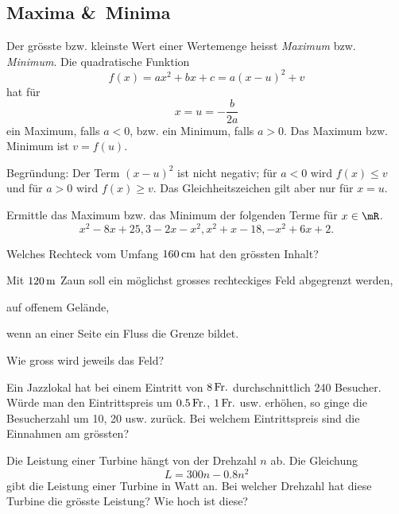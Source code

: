 \documentclass[%
11pt,%
twoside,%
titlepage,%
german,%
headsepline%
]{scrartcl}
\begin{document}
\subsection{Maxima \&\ Minima}
Der gr\"osste bzw. kleinste Wert einer Wertemenge heisst \emph{Maximum} bzw. \emph{Minimum}. Die quadratische Funktion
$$f(x)=ax^2+bx+c=a(x-u)^2+v$$
hat f\"ur
$$x =u=-\frac{b}{2a}$$
ein Maximum, falls $a<0$, bzw. ein Minimum, falls $a>0$. Das Maximum bzw. Minimum ist $v =f(u)$.

Begr\"undung: Der Term $(x - u)^2$ ist nicht negativ; f\"ur $a <0$ wird $f(x)\leq v$ und f\"ur $a > 0$ wird $f(x) \geq v$. Das Gleichheitszeichen gilt aber nur f\"ur $x =u$.

\begin{ueb}[Extremwerte]
Ermittle das Maximum bzw. das Minimum der folgenden Terme f\"ur $x\in\mR$.
$$x^2 -8x + 25, 3 - 2x - x^2, x^2 + x -18, - x^2 + 6x + 2.$$
\end{ueb}

\pagebreak

\begin{ueb}[Maximize]
Welches Rechteck vom Umfang $\unit[160]{cm}$ hat den gr\"ossten Inhalt?
\end{ueb}

\begin{ueb}
Mit $\unit[120]{m}$ Zaun soll ein m\"oglichst grosses rechteckiges Feld abgegrenzt werden,
\begin{enumeratea}
\item auf offenem Gel\"ande,
\item wenn an einer Seite ein Fluss die Grenze bildet.
\end{enumeratea}
Wie gross wird jeweils das Feld?
\end{ueb}

\begin{ueb}
Ein Jazzlokal hat bei einem Eintritt von $\unit[8]{Fr.}$ durchschnittlich 240 Besucher. W\"urde man den Eintrittspreis um $\unit[0.5]{Fr.}$, $\unit[1]{Fr.}$ usw. erh\"ohen, so ginge die Besucherzahl um 10, 20 usw. zur\"uck. Bei welchem Eintrittspreis sind die Einnahmen am gr\"ossten?
\end{ueb}

\begin{ueb}[Turbine]
Die Leistung einer Turbine h\"angt von der Drehzahl $n$ ab. Die Gleichung
$$L = 300n - 0.8n^2$$
gibt die Leistung einer Turbine in Watt an. Bei welcher Drehzahl hat diese Turbine die gr\"osste Leistung? Wie hoch ist diese?
\end{ueb}
\end{document}
